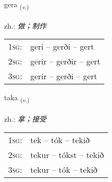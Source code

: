 \documentclass[frontgrid, backgrid]{flacards}\usepackage[]{graphicx}\usepackage[]{xcolor}
\begin{document}
{gera \small{\textsubscript{(\textit{v.})}} \\[1ex] %
\textphonetic{[cɛːra]} \\
zh.: \emph{做；制作} \\  [2ex]
\renewcommand*{\arraystretch}{0.8}
\begin{tabular}{p{1cm}l}
\textsc{1sg}: & geri -- gerði -- gert \\ 
\textsc{2sg}: & gerir -- gerðir -- gert \\ 
\textsc{3sg}: & gerir -- gerði -- gert \\ 
\end{tabular}
}

\renewcommand{\flhead}{\vskip5pt \fboxsep=0pt {\small\bfseries\footnotesize Sagnorð | 动词}}
\renewcommand{\fcfoot}{\vskip5pt \fboxsep=0pt \hspace{2pt}{\small\bfseries\footnotesize 1K}}

\renewcommand{\blhead}{\vskip5pt {\small\bfseries\footnotesize Sagnorð | 动词 }}
\renewcommand{\bcfoot}{\vskip5pt \hspace{2pt}{\small\bfseries\footnotesize 1K}}


{taka \small{\textsubscript{(\textit{v.})}} \\[1ex] %
\textphonetic{[tʰaːka]} \\
zh.: \emph{拿；接受} \\  [2ex]
\renewcommand*{\arraystretch}{0.8}
\begin{tabular}{p{1cm}l}
\textsc{1sg}: & tek -- tók -- tekið \\ 
\textsc{2sg}: & tekur -- tókst -- tekið \\ 
\textsc{3sg}: & tekur -- tók -- tekið \\ 
\end{tabular}
}


\renewcommand{\flhead}{\vskip5pt \fboxsep=0pt {\small\bfseries\footnotesize Samtenging | 连词}}
\renewcommand{\fcfoot}{\vskip5pt \fboxsep=0pt \hspace{2pt}{\small\bfseries\footnotesize 1K}}
\end{document}
